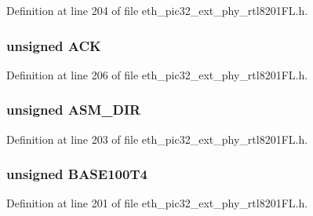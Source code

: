 Definition at line 204 of file eth\+\_\+pic32\+\_\+ext\+\_\+phy\+\_\+rtl8201\+F\+L.\+h.

\hypertarget{union_____a_n_l_p_a_dbits__t_a9d5913829bb2b681dc6257fc7e9b7a56}{}
\subsubsection[{A\+C\+K}]{\setlength{\rightskip}{0pt plus 5cm}unsigned A\+C\+K}\label{union_____a_n_l_p_a_dbits__t_a9d5913829bb2b681dc6257fc7e9b7a56}


Definition at line 206 of file eth\+\_\+pic32\+\_\+ext\+\_\+phy\+\_\+rtl8201\+F\+L.\+h.

\hypertarget{union_____a_n_l_p_a_dbits__t_a9ce4718733bcc9d125f46da36557d868}{}
\subsubsection[{A\+S\+M\+\_\+\+D\+I\+R}]{\setlength{\rightskip}{0pt plus 5cm}unsigned A\+S\+M\+\_\+\+D\+I\+R}\label{union_____a_n_l_p_a_dbits__t_a9ce4718733bcc9d125f46da36557d868}


Definition at line 203 of file eth\+\_\+pic32\+\_\+ext\+\_\+phy\+\_\+rtl8201\+F\+L.\+h.

\hypertarget{union_____a_n_l_p_a_dbits__t_ae7aa36d7ff2e31c4eb9726c67e04dfea}{}
\subsubsection[{B\+A\+S\+E100\+T4}]{\setlength{\rightskip}{0pt plus 5cm}unsigned B\+A\+S\+E100\+T4}\label{union_____a_n_l_p_a_dbits__t_ae7aa36d7ff2e31c4eb9726c67e04dfea}


Definition at line 201 of file eth\+\_\+pic32\+\_\+ext\+\_\+phy\+\_\+rtl8201\+F\+L.\+h.

